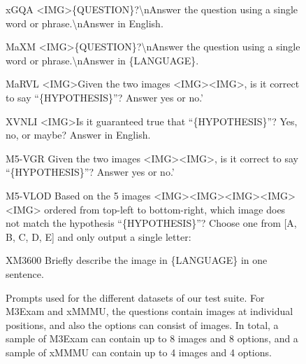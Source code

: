 \begin{figure*}[ht!]
\begin{promptbox}{xGQA}
    <IMG>\{QUESTION\}?\textbackslash{n}Answer the question using a single word or phrase.\textbackslash{n}Answer in English.
    \end{promptbox}
    \begin{promptbox}{MaXM}
    <IMG>\{QUESTION\}?\textbackslash{n}Answer the question using a single word or phrase.\textbackslash{n}Answer in \{LANGUAGE\}.
    \end{promptbox}
    \begin{promptbox}{MaRVL}
    <IMG>Given the two images <IMG><IMG>, is it correct to say ``\{HYPOTHESIS\}''? Answer yes or no.'
    \end{promptbox}
    \begin{promptbox}{XVNLI}
    <IMG>Is it guaranteed true that ``\{HYPOTHESIS\}''? Yes, no, or maybe? Answer in English.
    \end{promptbox}
    \begin{promptbox}{M5-VGR}
    Given the two images <IMG><IMG>, is it correct to say ``\{HYPOTHESIS\}''? Answer yes or no.'
    \end{promptbox}
    \begin{promptbox}{M5-VLOD}
    Based on the 5 images <IMG><IMG><IMG><IMG><IMG> ordered from top-left to bottom-right, which image does not match the hypothesis ``\{HYPOTHESIS\}''? Choose one from [A, B, C, D, E] and only output a single letter:
    \end{promptbox}
    \begin{promptbox}{XM3600}
    Briefly describe the image in \{LANGUAGE\} in one sentence.
    \end{promptbox}
    \caption{Prompts used for the different datasets of our test suite. For M3Exam and xMMMU, the questions contain images at individual positions, and also the options can consist of images. In total, a sample of M3Exam can contain up to 8 images and 8 options, and a sample of xMMMU can contain up to 4 images and 4 options.}
    \label{appendix:fig:evaluation:prompts}
\end{figure*}